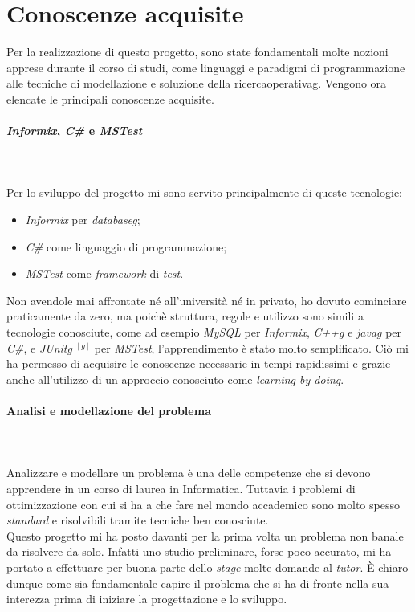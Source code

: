 \section{Conoscenze acquisite}
\label{sec:conoscenze-acquisite}
\noindent Per la realizzazione di questo progetto, sono state fondamentali
molte nozioni apprese durante il corso di studi,
come linguaggi e paradigmi di programmazione
alle tecniche di modellazione e soluzione della \gls{ricercaoperativag}.
Vengono ora elencate le principali conoscenze acquisite.
\paragraph{\textit{Informix}, \textit{C\#} e \textit{MSTest}}\hfill\\\\
\noindent Per lo sviluppo del progetto mi sono servito principalmente di queste tecnologie:
\begin{itemize}
    \item \textit{Informix} per \textit{\gls{databaseg}};
    \item \textit{C\#} come linguaggio di programmazione;
    \item \textit{MSTest} come \textit{framework} di \textit{test}.
\end{itemize}
\noindent Non avendole mai affrontate né all’università né in privato, ho dovuto
cominciare praticamente da zero, ma poichè struttura, regole e utilizzo sono simili
a tecnologie conosciute, come ad esempio \textit{MySQL} per \textit{Informix}, \textit{\gls{C++g}} e \textit{\gls{javag}} per \textit{C\#},
e \textit{\gls{JUnitg}} $^{[g]}$ per \textit{MSTest}, l’apprendimento è stato molto semplificato.
Ciò mi ha permesso di acquisire le conoscenze necessarie in tempi rapidissimi
e grazie anche all'utilizzo di un approccio conosciuto come \textit{learning
by doing}.
\paragraph{Analisi e modellazione del problema}\hfill\\\\
Analizzare e modellare un problema è una delle competenze che si devono apprendere
in un corso di laurea in Informatica.
Tuttavia i problemi di ottimizzazione con cui si ha a che fare
nel mondo accademico sono molto spesso \textit{standard} e risolvibili tramite tecniche ben conosciute.\\
Questo progetto mi ha posto davanti per la prima volta un problema
non banale da risolvere da solo. Infatti uno studio preliminare, forse poco accurato,
mi ha portato a effettuare per buona parte dello \textit{stage} molte domande al \textit{tutor}.
È chiaro dunque come sia fondamentale capire il problema che si ha di fronte nella
sua interezza prima di iniziare la progettazione e lo sviluppo.

